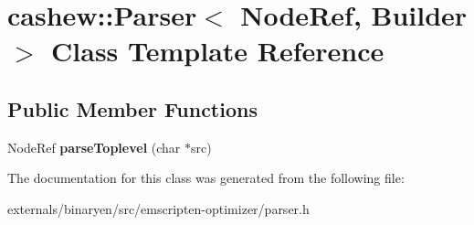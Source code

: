 \hypertarget{classcashew_1_1_parser}{}\section{cashew\+:\+:Parser$<$ Node\+Ref, Builder $>$ Class Template Reference}
\label{classcashew_1_1_parser}
\subsection*{Public Member Functions}
\begin{DoxyCompactItemize}
\item 
\mbox{\label{classcashew_1_1_parser_a0d1002cd88b84436b92fc8e5006bf82f}} 
Node\+Ref {\bfseries parse\+Toplevel} (char $\ast$src)
\end{DoxyCompactItemize}


The documentation for this class was generated from the following file\+:\begin{DoxyCompactItemize}
\item 
externals/binaryen/src/emscripten-\/optimizer/parser.\+h\end{DoxyCompactItemize}
